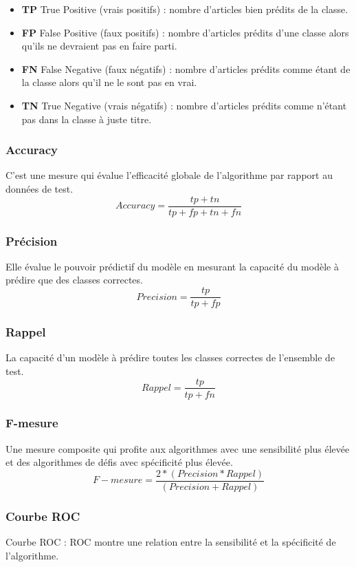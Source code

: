         \begin{itemize}
            \item{\textbf{TP }True Positive (vrais positifs) :} nombre d'articles bien prédits de la classe.
            \item{\textbf{FP }False Positive (faux positifs) :} nombre d'articles prédits d'une classe alors qu'ils ne devraient pas en faire parti.
            \item{\textbf{FN }False Negative (faux négatifs) :} nombre d'articles prédits comme étant de la classe alors qu'il ne le sont pas en vrai.
            \item{\textbf{TN }True Negative (vrais négatifs) :} nombre d'articles prédits comme n'étant pas dans la classe à juste titre.
        \end{itemize}
        
        \subsubsection{Accuracy} 
        C'est une mesure qui évalue l'efficacité globale de l'algorithme par rapport au données de test.
        \[ Accuracy = \frac{tp+tn} {tp+fp+tn+fn} \]
        \subsubsection{Précision} 
        Elle évalue le pouvoir prédictif du modèle en mesurant la capacité du modèle à prédire que des classes correctes.
        \[ Precision = \frac{tp} {tp+fp} \]
        \subsubsection{Rappel} 
        La capacité d’un modèle à prédire toutes les classes correctes de l'ensemble de test.
        \[ Rappel = \frac{tp} {tp+fn} \]
        \subsubsection{F-mesure}
        Une mesure composite qui profite aux algorithmes avec une sensibilité plus élevée et des algorithmes de défis avec spécificité plus élevée. \label{fmesure}
        \[ F-mesure = \frac{2 * (Precision * Rappel)} {(Precision + Rappel)}\]
        
        \subsubsection{Courbe ROC} 
        Courbe ROC : ROC montre une relation entre la sensibilité et la spécificité de l'algorithme.
        

